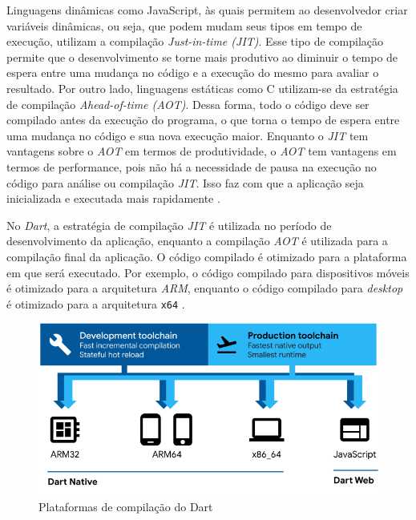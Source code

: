 Linguagens dinâmicas como JavaScript, às quais permitem ao desenvolvedor criar variáveis dinâmicas, ou seja, que podem mudam seus tipos em tempo de execução, utilizam a compilação \textit{Just-in-time (JIT)}. Esse tipo de compilação permite que o desenvolvimento se torne mais produtivo ao diminuir o tempo de espera entre uma mudança no código e a execução do mesmo para avaliar o resultado. Por outro lado, linguagens estáticas como C utilizam-se da estratégia de compilação \textit{Ahead-of-time (AOT)}. Dessa forma, todo o código deve ser compilado antes da execução do programa, o que torna o tempo de espera entre uma mudança no código e sua nova execução maior. Enquanto o \textit{JIT} tem vantagens sobre o \textit{AOT} em termos de produtividade, o \textit{AOT} tem vantagens em termos de performance, pois não há a necessidade de pausa na execução no código para análise ou compilação \textit{JIT}. Isso faz com que a aplicação seja inicializada e executada mais rapidamente \cite{leler2017flutterdart}.

No \textit{Dart}, a estratégia de compilação \textit{JIT} é utilizada no período de desenvolvimento da aplicação, enquanto a compilação \textit{AOT} é utilizada para a compilação final da aplicação. O código compilado é otimizado para a plataforma em que será executado. Por exemplo, o código compilado para dispositivos móveis é otimizado para a arquitetura \textit{ARM}, enquanto o código compilado para \textit{desktop} é otimizado para a arquitetura \texttt{x64} \cite{dart-platforms}.

\begin{figure}[!ht]
  \includegraphics[width=1\textwidth, keepaspectratio=true]{figuras/cap2/2_1_2_dart-platforms.png}
  \centering
  \caption[Plataformas de compilação do Dart]{Plataformas de compilação do Dart \protect\cite{dart-platforms}}
  \label{fig:dart_plataforms}
\end{figure}

